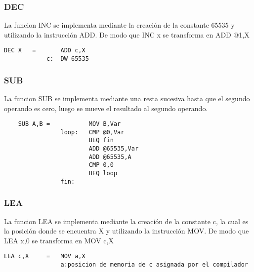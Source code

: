 \documentclass[12pt]{article}
\begin{document}
\subsubsection{DEC}
La funcion INC se implementa mediante la creaci\'on de la constante 65535 y utilizando la instrucci\'on ADD. De modo que INC x se transforma en ADD @1,X
\begin{verbatim}
DEC X   =       ADD c,X
            c:  DW 65535
\end{verbatim} 
\subsubsection{SUB}
La funcion SUB se implementa mediante una resta sucesiva hasta que el segundo operando es cero, luego se mueve el resultado al  segundo operando.
\begin{verbatim}
    SUB A,B =           MOV B,Var 
                loop:   CMP @0,Var 
                        BEQ fin 
                        ADD @65535,Var
                        ADD @65535,A 
                        CMP 0,0
                        BEQ loop
                fin:
\end{verbatim}
\subsubsection{LEA}
La funcion LEA se implementa mediante la creaci\'on de la constante c, la cual es la posici\'on donde se encuentra X y utilizando la instrucci\'on MOV. De modo que LEA x,0 se transforma en MOV c,X
\begin{verbatim}
LEA c,X     =   MOV a,X
                a:posicion de memoria de c asignada por el compilador
\end{verbatim}  
\end{document}
